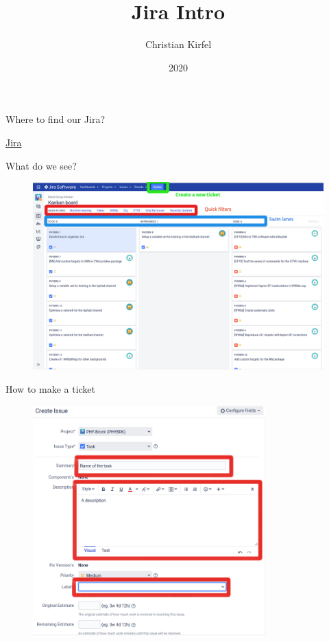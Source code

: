 \documentclass{beamer}
\title{Jira Intro}
\author{Christian Kirfel}
\institute{Physikalisches Institut Bonn}
\date{2020}
\begin{document}
\frame{\titlepage}

\begin{frame}{Where to find our Jira?}
    \begin{center}
      \Huge \href{https://jira.team.uni-bonn.de/secure/RapidBoard.jspa?rapidView=125&view=detail&selectedIssue=PHYBRK-1}{Jira}
    \end{center}
\end{frame}

\begin{frame}{What do we see?}
\begin{figure}
  \includegraphics[width=\textwidth]{overview.png}
\end{figure}
\end{frame}

\begin{frame}{How to make a ticket}
\begin{figure}
  \includegraphics[width=0.8\textwidth]{ticket1.png}
\end{figure}
\end{frame}
\end{document}
